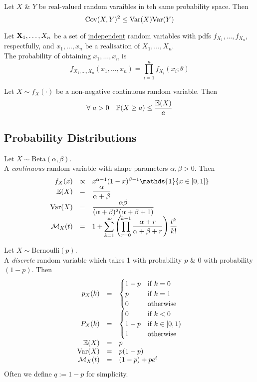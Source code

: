\documentclass[11pt,a4paper]{article}
\begin{document}
Let $X$ \& $Y$ be real-valued random varaibles in teh same probability space. Then
$$\mathrm{Cov}(X,Y)^2\leq\mathrm{Var}(X)\mathrm{Var}(Y)$$

Let $\textbf{X}_1,\dots,X_n$ be a set of \underline{independent} random variables with pdfs $f_{X_1},\dots,f_{X_n}$, respectfully, and $x_1,\dots,x_n$ be a realisation of $X_1,\dots,X_n$.\\
The probability of obtaining $x_1,\dots,x_n$ is
$$f_{X_1,\dots,X_n}(x_1,\dots,x_n)=\prod_{i=1}^nf_{X_i}(x_i;\theta)$$

Let $X\sim f_X(\cdot)$ be a non-negative continuous random variable. Then
$$\forall\ a>0\quad\mathbb{P}(X\geq a)\leq\frac{\mathbb{E}(X)}{a}$$

\subsection{Probability Distributions}

Let $X\sim\text{Beta}(\alpha,\beta)$.\\
A \textit{continuous} random variable with shape parameters $\alpha,\beta>0$. Then
\[\begin{array}{rcl}
f_X(x)&\propto&x^{\alpha-1}(1-x)^{\beta-1}\mathds{1}\{x\in[0,1]\}\\
\expect(X)&=&\dfrac{\alpha}{\alpha+\beta}\\
\var(X)&=&\dfrac{\alpha\beta}{(\alpha+\beta)^2(\alpha+\beta+1)}\\
\mathcal{M}_X(t)&=&1+{\displaystyle\sum_{k=1}^\infty\left(\prod_{r=0}^{k-1}\dfrac{\alpha+r}{\alpha+\beta+r}\right)\dfrac{t^k}{k!}}
\end{array}\]

Let $X\sim\text{Bernoulli}(p)$.\\
A \textit{discrete} random variable which takes 1 with probability $p$ \& 0 with probability $(1-p)$. Then
\[\begin{array}{rcl}
p_X(k)&=&\begin{cases}1-p&\text{if }k=0\\p&\text{if }k=1\\0&\text{otherwise}\end{cases}\\
P_X(k)&=&\begin{cases}0&\text{if }k<0\\1-p&\text{if }k\in[0,1)\\1&\text{otherwise}\end{cases}\\
\mathbb{E}(X)&=&p\\
\mathrm{Var}(X)&=&p(1-p)\\
\mathcal{M}_X(t)&=&(1-p)+pe^t
\end{array}\]
\nb Often we define $q:=1-p$ for simplicity.\\
\end{document}
